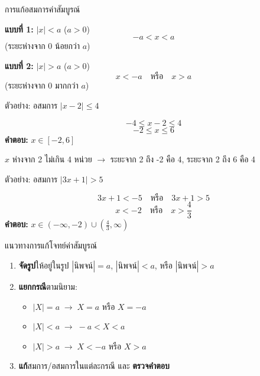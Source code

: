 \documentclass[11pt, aspectratio=169]{beamer}
\begin{document}
\begin{frame}{การแก้อสมการค่าสัมบูรณ์}
  \begin{explanation}
    \textbf{แบบที่ 1:} $|x| < a$ \quad ($a > 0$)
    \[
      -a < x < a
    \]
    (ระยะห่างจาก 0 น้อยกว่า $a$)

    \textbf{แบบที่ 2:} $|x| > a$ \quad ($a > 0$)
    \[
      x < -a \quad \textbf{หรือ} \quad x > a
    \]
    (ระยะห่างจาก 0 มากกว่า $a$)
  \end{explanation}
\end{frame}

\begin{frame}{ตัวอย่าง: อสมการ $|x - 2| \leq 4$}
  \begin{exambox}
    \[
      -4 \leq x - 2 \leq 4
    \]
    \[
      -2 \leq x \leq 6
    \]
    \textbf{คำตอบ:} $x \in [-2, 6]$
  \end{exambox}

  \begin{intuition}[ความหมาย]
    $x$ ห่างจาก 2 ไม่เกิน 4 หน่วย $\rightarrow$ ระยะจาก 2 ถึง -2 คือ 4, ระยะจาก 2 ถึง 6 คือ 4
  \end{intuition}
\end{frame}

\begin{frame}{ตัวอย่าง: อสมการ $|3x + 1| > 5$}
  \begin{exambox}[โจทย์: $|3x + 1| > 5$]
    \[
      3x + 1 < -5 \quad \text{หรือ} \quad 3x + 1 > 5
    \]
    \[
      x < -2 \quad \text{หรือ} \quad x > \frac{4}{3}
    \]
    \textbf{คำตอบ:} $x \in (-\infty, -2) \cup (\frac{4}{3}, \infty)$
  \end{exambox}
\end{frame}

\begin{frame}{แนวทางการแก้โจทย์ค่าสัมบูรณ์}
  \begin{intuition}
    \begin{enumerate}
      \item \textbf{จัดรูป}ให้อยู่ในรูป $|\text{นิพจน์}| = a$, $|\text{นิพจน์}| < a$, หรือ $|\text{นิพจน์}| > a$
      \item \textbf{แยกกรณี}ตามนิยาม:
      \begin{itemize}
        \item $|X| = a \;\rightarrow\; X = a$ หรือ $X = -a$
        \item $|X| < a \;\rightarrow\; -a < X < a$
        \item $|X| > a \;\rightarrow\; X < -a$ หรือ $X > a$
      \end{itemize}
      \item \textbf{แก้}สมการ/อสมการในแต่ละกรณี และ \textbf{ตรวจคำตอบ}
    \end{enumerate}
  \end{intuition}
\end{frame}
\end{document}
